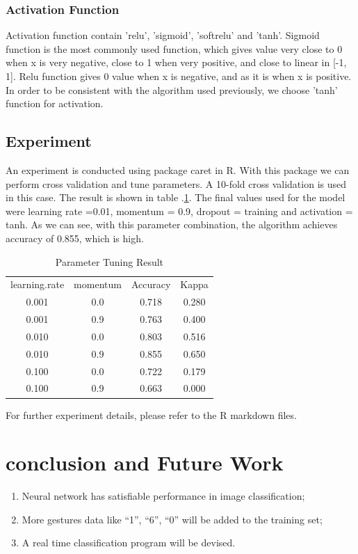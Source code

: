 \documentclass[format=acmsmall,review=false, screen=true, authorversion=true]{acmart}
\begin{document}
\subsubsection{Activation Function}
Activation function contain 'relu', 'sigmoid', 'softrelu' and 'tanh'. Sigmoid function is the most commonly used function, which gives value very close to 0 when x is very negative, close to 1 when very positive, and close to linear in [-1, 1]. Relu function gives 0 value when x is negative, and as it is when x is positive. In order to be consistent with the algorithm used previously, we choose 'tanh' function for activation.  

\subsection{Experiment}
An experiment is conducted using package caret in R. With this package we can perform cross validation and tune parameters. A 10-fold cross validation is used in this case. The result is shown in table .\ref{tab:tune}. The final values used for the model were learning rate =0.01, momentum = 0.9, dropout = training and activation
 = tanh. As we can see, with this parameter combination, the algorithm achieves accuracy of 0.855, which is high. 
 
\begin{table}[h]
\caption{Parameter Tuning Result}
\label{tab:tune}
\begin{center}
\begin{tabular}{c c c c}
  \hline
learning.rate  &momentum  &Accuracy    &Kappa\\       
  0.001          &0.0       &0.718  &0.280\\
  0.001          &0.9       &0.763  &0.400\\
  0.010          &0.0       &0.803  &0.516\\
  0.010          &0.9       &0.855  &0.650\\
  0.100          &0.0       &0.722  &0.179\\
  0.100          &0.9       &0.663  &0.000\\
\hline
\end{tabular}
\end{center}
\end{table}

For further experiment details, please refer to the R markdown files.

\section{conclusion and Future Work}

\begin{enumerate}
\item Neural network has satisfiable performance in image classification;
\item More gestures data like ``1'', ``6'', ``0'' will be added to the training set;
\item A real time classification program will be devised. 
\end{enumerate}



%
% 
\end{document}
